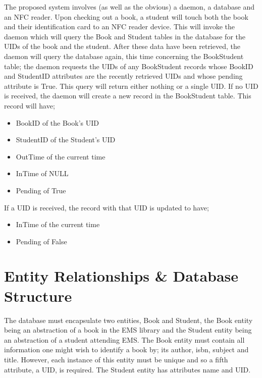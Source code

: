 \documentclass[draft]{book}
\begin{document}
The proposed system involves (as well as the obvious) a daemon, a database and
an NFC reader. Upon checking out a book, a student will touch both the book and
their identification card to an NFC reader device. This will invoke the daemon
which will query the Book and Student tables in the database for the UIDs of the
book and the student. After these data have been retrieved, the daemon will
query the database again, this time concerning the BookStudent table; the daemon
requests the UIDs of any BookStudent records whose BookID and StudentID
attributes are the recently retrieved UIDs and whose pending attribute is True.
This query will return either nothing or a single UID. If no UID is received,
the daemon will create a new record in the BookStudent table. This record will
have;\begin{itemize}

    \item BookID of the Book's UID

    \item StudentID of the Student's UID

    \item OutTime of the current time

    \item InTime of NULL

    \item Pending of True

\end{itemize} If a UID is received, the record with that UID is updated to
have;\begin{itemize}

    \item InTime of the current time

    \item Pending of False

\end{itemize}

\section{Entity Relationships \& Database Structure}

The database must encapsulate two entities, Book and Student, the Book entity
being an abstraction of a book in the EMS library and the Student entity being
an abstraction of a student attending EMS. The Book entity must contain all
information one might wish to identify a book by; its author, isbn, subject and
title. However, each instance of this entity must be unique and so a fifth
attribute, a UID, is required. The Student entity has attributes name and UID.
\end{document}
